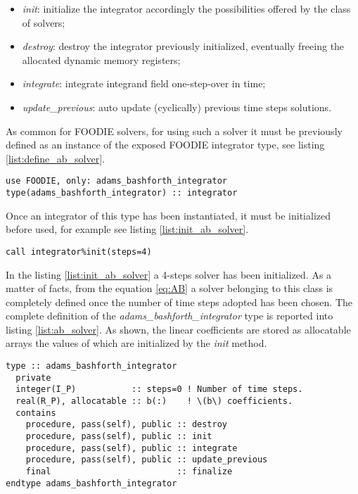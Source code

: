 \begin{itemize}
  \item \emph{init}: initialize the integrator accordingly the possibilities offered by the class of solvers;
  \item \emph{destroy}: destroy the integrator previously initialized, eventually freeing the allocated dynamic memory registers;
  \item \emph{integrate}: integrate integrand field one-step-over in time;
  \item \emph{update\_previous}: auto update (cyclically) previous time steps solutions.
  \end{itemize}

As common for FOODIE solvers, for using such a solver it must be previously defined as an instance of the exposed FOODIE integrator type, see listing \ref{list:define_ab_solver}.

\begin{lstlisting}[firstnumber=1,style=code,caption={definition of an explicit Adams-Bashforth integrator},label={list:define_ab_solver}]
use FOODIE, only: adams_bashforth_integrator
type(adams_bashforth_integrator) :: integrator
\end{lstlisting}

Once an integrator of this type has been instantiated, it must be initialized before used, for example see listing \ref{list:init_ab_solver}.

\begin{lstlisting}[firstnumber=1,style=code,caption={example of initialization of an explicit Adams-Bashforth integrator},label={list:init_ab_solver}]
call integrator%init(steps=4)
\end{lstlisting}

In the listing \ref{list:init_ab_solver} a 4-steps solver has been initialized. As a matter of facts, from the equation \ref{eq:AB} a solver belonging to this class is completely defined once the number of time steps adopted has been chosen. The complete definition of the \emph{adams\_bashforth\_integrator} type is reported into listing \ref{list:ab_solver}. As shown, the linear coefficients are stored as allocatable arrays the values of which are initialized by the \emph{init} method.

\begin{lstlisting}[firstnumber=1,style=code,caption={definition of \emph{adams\_bashforth\_integrator} type},label={list:ab_solver}]
type :: adams_bashforth_integrator
  private
  integer(I_P)           :: steps=0 ! Number of time steps.
  real(R_P), allocatable :: b(:)    ! \(b\) coefficients.
  contains
    procedure, pass(self), public :: destroy
    procedure, pass(self), public :: init
    procedure, pass(self), public :: integrate
    procedure, pass(self), public :: update_previous
    final                         :: finalize
endtype adams_bashforth_integrator
\end{lstlisting}

